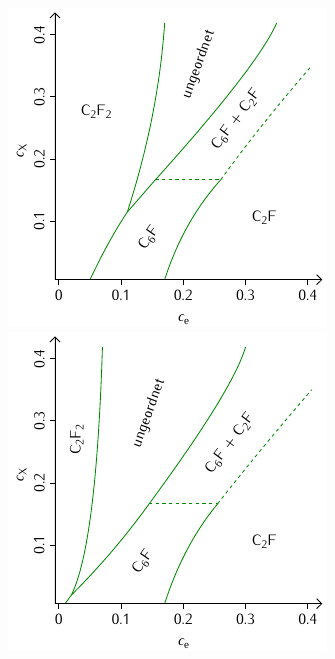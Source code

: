 \documentclass[a4paper, 10pt, twoside, openany]{book} %
\begin{document}
\begin{figure}
		\medskip
		
		\begin{minipage}[b]{0.48\textwidth}
			\includegraphics[width=\textwidth]{Abbildungen/Phasendiagramme/Schemata/F.pdf}
		\end{minipage}
		\hfill
		\begin{minipage}[b]{0.48\textwidth}
			\includegraphics[width=\textwidth]{Abbildungen/Phasendiagramme/Schemata/F_penalty.pdf}

\end{minipage}
\end{figure}
\end{document}

